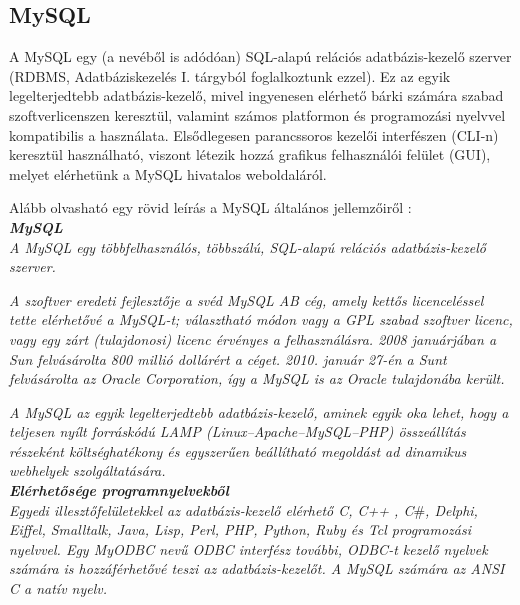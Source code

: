 
\subsection{MySQL}

A MySQL egy (a nevéből is adódóan) SQL-alapú relációs adatbázis-kezelő szerver (RDBMS, Adatbáziskezelés I. tárgyból foglalkoztunk ezzel).
Ez az egyik legelterjedtebb adatbázis-kezelő, mivel ingyenesen elérhető bárki számára szabad szoftverlicenszen keresztül, valamint számos platformon és programozási nyelvvel kompatibilis a használata.
Elsődlegesen parancssoros kezelői interfészen (CLI-n) keresztül használható, viszont létezik hozzá grafikus felhasználói felület (GUI), melyet elérhetünk a MySQL hivatalos weboldaláról.

Alább olvasható egy rövid leírás a MySQL általános jellemzőiről \cite{mysqlcikk}:\\

\noindent\textit{\textbf{\large{MySQL}}}\\

\textit{A MySQL egy többfelhasználós, többszálú, SQL-alapú relációs adatbázis-kezelő szerver.}

\textit{A szoftver eredeti fejlesztője a svéd MySQL AB cég, amely kettős licenceléssel tette elérhetővé a MySQL-t; választható módon vagy a GPL szabad szoftver licenc, vagy egy zárt (tulajdonosi) licenc érvényes a felhasználásra. 2008 januárjában a Sun felvásárolta 800 millió dollárért a céget. 2010. január 27-én a Sunt felvásárolta az Oracle Corporation, így a MySQL is az Oracle tulajdonába került.}

\textit{A MySQL az egyik legelterjedtebb adatbázis-kezelő, aminek egyik oka lehet, hogy a teljesen nyílt forráskódú LAMP (Linux–Apache–MySQL–PHP) összeállítás részeként költséghatékony és egyszerűen beállítható megoldást ad dinamikus webhelyek szolgáltatására.}\\

\noindent\textit{\textbf{Elérhetősége programnyelvekből}}\\

\textit{Egyedi illesztőfelületekkel az adatbázis-kezelő elérhető C, C++ , C}\#\textit{, Delphi, Eiffel, Smalltalk, Java, Lisp, Perl, PHP, Python, Ruby és Tcl programozási nyelvvel. Egy MyODBC nevű ODBC interfész további, ODBC-t kezelő nyelvek számára is hozzáférhetővé teszi az adatbázis-kezelőt. A MySQL számára az ANSI C a natív nyelv.}\\

